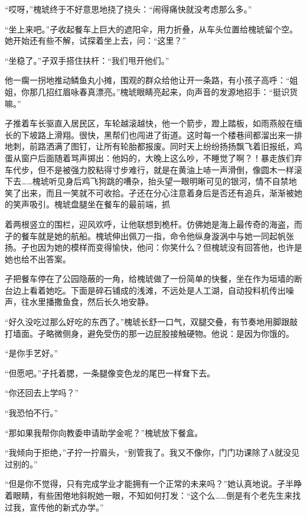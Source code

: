 \documentclass{article}
\begin{document}
“哎呀，”槐琥终于不好意思地挠了挠头：“闹得痛快就没考虑那么多。”

\newpage 



“坐上来吧。”孑收起餐车上巨大的遮阳伞，用力折叠，从车头位置给槐琥留个空。她开始还有些不解，试探着坐上去，问：“这里？”

“坐稳了。”孑双手搭住扶杆：“我们甩开他们。”

他一瘸一拐地推动鳞鱼丸小摊，围观的群众给他让开一条路，有小孩子高呼：“姐姐，你那几招红眉咏春真漂亮。”槐琥眼睛亮起来，向声音的发源地招手：“挺识货嘛。”

孑推着车长驱直入居民区，车轮越滚越快，他一个箭步，蹬上踏板，如雨燕般在缅长的下坡路上滑翔。很快，黑帮们也闯进了街道。这时每一个楼巷间都溜出来一排地刺，前路洒满了图钉，让所有轮胎都报废。同时天上纷纷扬扬飘飞着旧报纸，鸡蛋从窗户后面随着骂声掷出：他妈的，大晚上这么吵，不睡觉了啊？！暴走族们弃车代步，但不是被强力胶粘得寸步难行，就是在黄油上哧一声滑倒，像圆木一样滚下去……槐琥听见身后鸡飞狗跳的嘈杂，抬头望一眼明晰可见的银河，情不自禁地笑了出来，而且一笑就不可收拾。孑还在分心注意着身后是否还有追兵，渐渐被她的笑声吸引。槐琥盘腿坐在餐车的最前端，抓

\newpage 

着两根竖立的围栏，迎风欢呼，让他联想到桅杆。仿佛她是海上最传奇的海盗，而孑的餐车就是她的航船。槐琥伸出佩刀一指，命令他纵身漩涡中与她一同起帆张扬。孑也因为她的模样而变得愉快，他问：你笑什么？但槐琥没有回答他，也许是她也给不出答案。

孑把餐车停在了公园隐蔽的一角，给槐琥做了一份简单的快餐，坐在作为垣墙的断台边上看着她吃。下面是碎石铺成的浅滩，不远处是人工湖，自动投料机传出噪声，往水里播撒鱼食，然后长久地安静。

“好久没吃过那么好吃的东西了。”槐琥长舒一口气，双腿交叠，有节奏地用脚跟敲打墙面。孑略微侧身，避免受伤的那一边屁股接触硬物。他说：是因为你饿的。

“是你手艺好。”

“但愿吧。”孑托着腮，一条腿像变色龙的尾巴一样耷下去。

“你还回去上学吗？”

“我恐怕不行。”

“那如果我帮你向教委申请助学金呢？”槐琥放下餐盒。

\newpage 



“我倾向于拒绝，”孑拧一拧眉头，“别管我了。我又不像你，门门功课除了A就没见过别的。”

“但是你不觉得，只有完成学业才能拥有一个正常的未来吗？”她认真地说。孑半睁着眼睛，有些困倦地斜睨她一眼，不知如何打发：“这个么……倒是有个老先生来找过我，宣传他的新式办学。”
\end{document}
